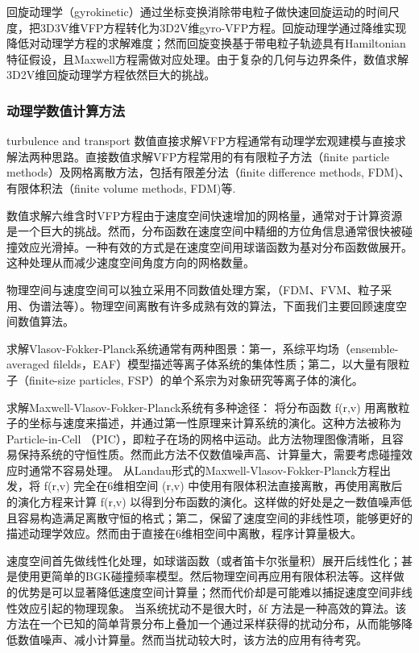   回旋动理学（gyrokinetic）\cite{Garbet2010}通过坐标变换消除带电粒子做快速回旋运动的时间尺度，把3D3V维VFP方程转化为3D2V维gyro-VFP方程。回旋动理学通过降维实现降低对动理学方程的求解难度；然而回旋变换基于带电粒子轨迹具有Hamiltonian特征假设\cite{Garbet2010}，且Maxwell方程需做对应处理。由于复杂的几何与边界条件，数值求解3D2V维回旋动理学方程依然巨大的挑战。
  
\subsubsection{动理学数值计算方法}
\label{动理学数值计算方法}

  turbulence\cite{Doyle2007} and transport 
  数值直接求解VFP方程通常有动理学宏观建模与直接求解法两种思路。直接数值求解VFP方程常用的有有限粒子方法（finite particle methods）及网格离散方法，包括有限差分法（finite difference methods, FDM)、有限体积法（finite volume methods, FDM)等.
  
  数值求解六维含时VFP方程由于速度空间快速增加的网格量，通常对于计算资源是一个巨大的挑战\cite{Heikkinen2007}。然而，分布函数在速度空间中精细的方位角信息通常很快被碰撞效应光滑掉。一种有效的方式是在速度空间用球谐函数为基对分布函数做展开。这种处理从而减少速度空间角度方向的网格数量。

  物理空间与速度空间可以独立采用不同数值处理方案，（FDM、FVM、粒子采用、伪谱法等）。物理空间离散有许多成熟有效的算法，下面我们主要回顾速度空间数值算法。
  
  求解Vlasov-Fokker-Planck系统通常有两种图景：第一，系综平均场（ensemble-averaged filelds，EAF）模型描述等离子体系统的集体性质；第二，以大量有限粒子（finite-size particles, FSP）的单个系宗为对象研究等离子体的演化。

  求解Maxwell-Vlasov-Fokker-Planck系统有多种途径：
	将分布函数 f(r,v) 用离散粒子的坐标与速度来描述，并通过第一性原理来计算系统的演化。这种方法被称为 Particle-in-Cell （PIC），即粒子在场的网格中运动。此方法物理图像清晰，且容易保持系统的守恒性质。然而此方法不仅数值噪声高、计算量大，需要考虑碰撞效应时通常不容易处理。
	从Landau形式的Maxwell-Vlasov-Fokker-Planck方程出发，将 f(r,v) 完全在6维相空间 (r,v) 中使用有限体积法直接离散，再使用离散后的演化方程来计算 f(r,v) 以得到分布函数的演化。这样做的好处是之一数值噪声低且容易构造满足离散守恒的格式；第二，保留了速度空间的非线性项，能够更好的描述动理学效应。然而由于直接在6维相空间中离散，程序计算量极大。
 
	速度空间首先做线性化处理，如球谐函数（或者笛卡尔张量积）展开后线性化；甚是使用更简单的BGK碰撞频率模型。然后物理空间再应用有限体积法等。这样做的优势是可以显著降低速度空间计算量；然而代价却是可能难以捕捉速度空间非线性效应引起的物理现象。
	当系统扰动不是很大时，δf 方法是一种高效的算法。该方法在一个已知的简单背景分布上叠加一个通过采样获得的扰动分布，从而能够降低数值噪声、减小计算量。然而当扰动较大时，该方法的应用有待考究。

